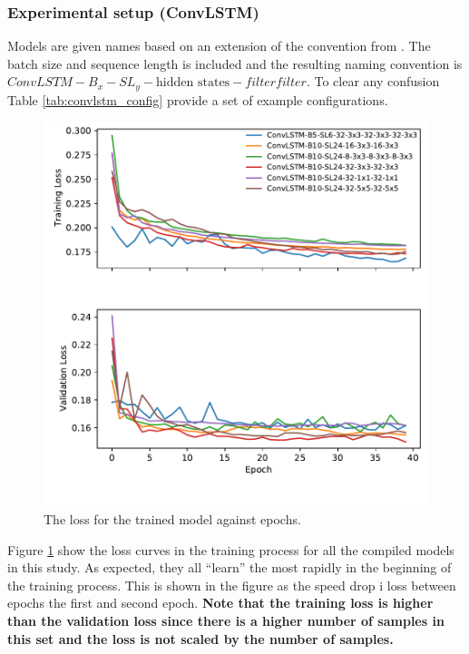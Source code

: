 \subsubsection{Experimental setup (ConvLSTM)}
Models are given names based on an extension of the convention from .
The batch size and sequence length is included and  %
the resulting naming convention is  $ConvLSTM-B_{x}-SL_{y}-\text{hidden states}-filter$\times$filter$. To clear any confusion Table \ref{tab:convlstm_config} provide a set of example configurations. 

\begin{figure}
    \centering
    \includegraphics{python_figs/epoch_vs_loss.pdf}
    \caption{The loss for the trained model against epochs.}
    \label{fig:convlstm_loss}
\end{figure}
Figure \ref{fig:convlstm_loss} show the loss curves in the training process for all the compiled models in this study. As expected, they all ``learn'' the most rapidly in the beginning of the training process. This is shown in the figure as the speed drop i loss between epochs the first and second epoch. \textbf{Note that the training loss is higher than the validation loss since there is a higher number of samples in this set and the loss is not scaled by the number of samples.} 

